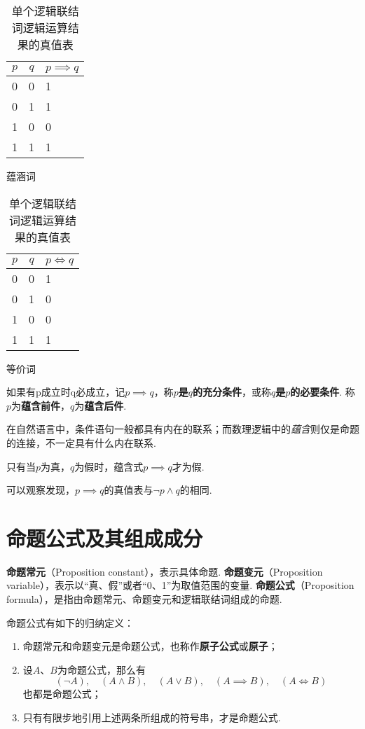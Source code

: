 \begin{table}[ht]
\begin{subtable}[ht]{0.45\textwidth}
\centering
\begin{tabular}{|*{2}{c|}p{2cm}|}
\hline
\(p\) & \(q\) & \(p \implies q\) \\ \hline
0 & 0 & 1 \\ \hline
0 & 1 & 1 \\ \hline
1 & 0 & 0 \\ \hline
1 & 1 & 1 \\ \hline
\end{tabular}
\caption{蕴涵词}
\end{subtable}
\begin{subtable}[ht]{0.45\textwidth}
\centering
\begin{tabular}{|*{2}{c|}p{2cm}|}
\hline
\(p\) & \(q\) & \(p \iff q\) \\ \hline
0 & 0 & 1 \\ \hline
0 & 1 & 0 \\ \hline
1 & 0 & 0 \\ \hline
1 & 1 & 1 \\ \hline
\end{tabular}
\caption{等价词}
\end{subtable}

\caption{单个逻辑联结词逻辑运算结果的真值表}
\end{table}

\begin{definition}
如果有p成立时q必成立，记\(p \implies q\)，称\textbf{\(p\)是\(q\)的充分条件}，或称\textbf{\(q\)是\(p\)的必要条件}.
称\(p\)为\textbf{蕴含前件}，\(q\)为\textbf{蕴含后件}.
\end{definition}

在自然语言中，条件语句一般都具有内在的联系；而数理逻辑中的\emph{蕴含}则仅是命题的连接，不一定具有什么内在联系.

\begin{property}
只有当\(p\)为真，\(q\)为假时，蕴含式\(p \implies q\)才为假.
\end{property}
可以观察发现，\(p \implies q\)的真值表与\(\neg p \land q\)的相同.

\section{命题公式及其组成成分}
\begin{definition}
\textbf{命题常元}（Proposition constant），表示具体命题.
\textbf{命题变元}（Proposition variable），表示以“真、假”或者“0、1”为取值范围的变量.
\textbf{命题公式}（Proposition formula），是指由命题常元、命题变元和逻辑联结词组成的命题.

命题公式有如下的归纳定义：
\begin{enumerate}
\item 命题常元和命题变元是命题公式，也称作\textbf{原子公式}或\textbf{原子}；
\item 设\(A\)、\(B\)为命题公式，那么有\[
(\neg A),\quad (A \land B),\quad (A \lor B),\quad (A \implies B),\quad (A \iff B)
\]也都是命题公式；
\item 只有有限步地引用上述两条所组成的符号串，才是命题公式.
\end{enumerate}
\end{definition}

